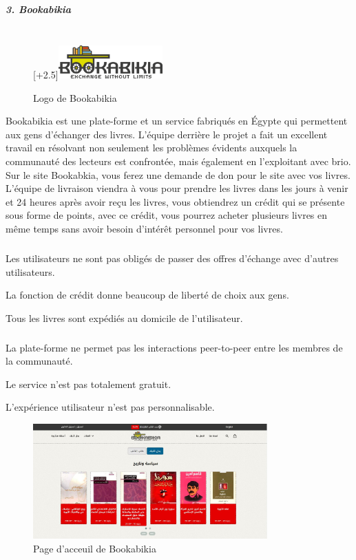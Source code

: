 \subparagraph{{\large 3. Bookabikia\\\\}}

\begin{figure}
	\raisebox{0pt}[\dimexpr\height+2.5\baselineskip\relax]{\includegraphics[width=4cm]{Images/chapter1/bookabikiaLogo.png}}
	\caption{Logo de Bookabikia}
\end{figure}

Bookabikia est une plate-forme et un service fabriqués en Égypte qui permettent aux gens d'échanger des livres. L'équipe derrière le projet a fait un excellent travail en résolvant non seulement les problèmes évidents auxquels la communauté des lecteurs est confrontée, mais également en l'exploitant avec brio. Sur le site Bookabkia, vous ferez une demande de don pour le site avec vos livres. L’équipe de livraison viendra à vous pour prendre les livres dans les jours à venir et 24 heures après avoir reçu les livres, vous obtiendrez un crédit qui se présente sous forme de points, avec ce crédit, vous pourrez acheter plusieurs livres en même temps sans avoir besoin d’intérêt personnel pour vos livres.

\subparagraph*{}
\begin{list}{•}{\textbf{Avantages}}
	\item Les utilisateurs ne sont pas obligés de passer des offres d'échange avec d'autres utilisateurs.
	\item La fonction de crédit donne beaucoup de liberté de choix aux gens.
	\item Tous les livres sont expédiés au domicile de l'utilisateur.
\end{list}

\subparagraph*{}
\begin{list}{•}{\textbf{Inconvénients}}
	\item La plate-forme ne permet pas les interactions peer-to-peer entre les membres de la communauté.
	\item Le service n'est pas totalement gratuit.
	\item L'expérience utilisateur n'est pas personnalisable.
\end{list}

\begin{figure}[h]
	\begin{center}
		\includegraphics[width=9cm]{Images/chapter1/bookabikiaScreenshot.jpg}
		\caption{Page d'acceuil de Bookabikia}
	\end{center}
\end{figure}

